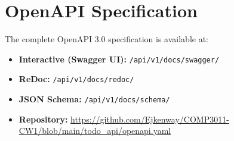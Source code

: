\documentclass[11pt,a4paper]{article}
\begin{document}
\section{OpenAPI Specification}

The complete OpenAPI 3.0 specification is available at:

\begin{itemize}
    \item \textbf{Interactive (Swagger UI):} \texttt{/api/v1/docs/swagger/}
    \item \textbf{ReDoc:} \texttt{/api/v1/docs/redoc/}
    \item \textbf{JSON Schema:} \texttt{/api/v1/docs/schema/}
    \item \textbf{Repository:} \url{https://github.com/Ejkenway/COMP3011-CW1/blob/main/todo_api/openapi.yaml}
\end{itemize}
\end{document}
